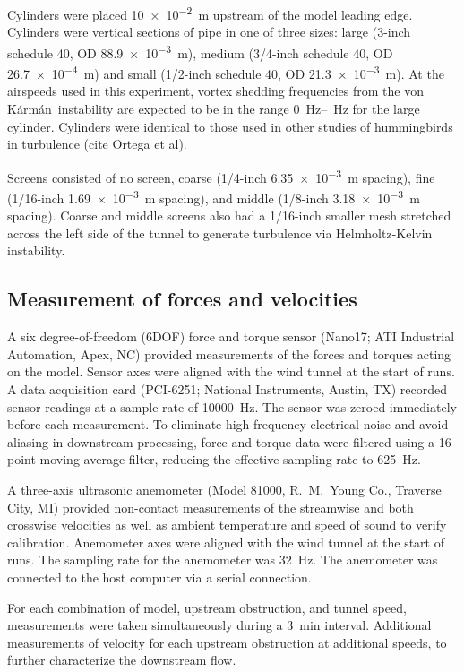 \documentclass{jfm}
\newcommand{\vonKarman}{von K\'{a}rm\'{a}n}
\begin{document}
Cylinders were placed \SI{10e-2}{\meter} upstream of the model leading edge.  Cylinders were vertical sections of pipe in one of three sizes: large (3-inch schedule 40, OD \SI{88.9e-3}{\meter}), medium (3/4-inch schedule 40, OD \SI{26.7e-4}{\meter}) and small (1/2-inch schedule 40, OD \SI{21.3e-3}{\meter}).  %
At the airspeeds used in this experiment, vortex shedding frequencies from the \vonKarman\ instability are expected to be in the range \SIrange{0}{}{\hertz} for the large cylinder. Cylinders were identical to those used in other studies of hummingbirds in turbulence (cite Ortega et al). 

Screens consisted of no screen, coarse (1/4-inch \SI{6.35e-3}{\meter} spacing), fine (1/16-inch \SI{1.69e-3}{\meter} spacing), and middle (1/8-inch \SI{3.18e-3}{\meter} spacing). Coarse and middle screens also had a 1/16-inch smaller mesh stretched across the left side of the tunnel to generate turbulence via Helmholtz-Kelvin instability.  

\subsection{Measurement of forces and velocities}
A six degree-of-freedom (6DOF) force and torque sensor (Nano17; ATI Industrial Automation, Apex, NC) provided measurements of the forces and torques acting on the model.  Sensor axes were aligned with the wind tunnel at the start of runs.  A data acquisition card (PCI-6251; National Instruments, Austin, TX) recorded sensor readings at a sample rate of \SI{10000}{\hertz}.  The sensor was zeroed immediately before each measurement.  To eliminate high frequency electrical noise and avoid aliasing in downstream processing, force and torque data were filtered using a 16-point moving average filter, reducing the effective sampling rate to \SI{625}{\hertz}.  

A three-axis ultrasonic anemometer (Model 81000, R.~M.~Young Co., Traverse City, MI) provided non-contact measurements of the streamwise and both crosswise velocities as well as ambient temperature and speed of sound to verify calibration.  Anemometer axes were aligned with the wind tunnel at the start of runs.  The sampling rate for the anemometer was \SI{32}{\hertz}. The anemometer was connected to the host computer via a serial connection.   

For each combination of model, upstream obstruction, and tunnel speed, measurements were taken simultaneously during a \SI{3}{\minute} interval.  Additional measurements of velocity for each upstream obstruction at additional speeds, to further characterize the downstream flow.  
\end{document}
